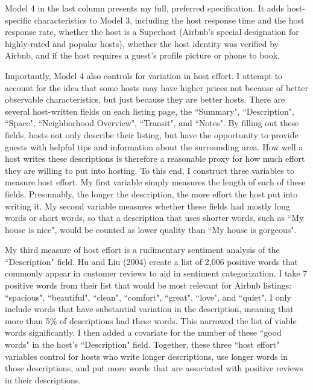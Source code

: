Model 4 in the last column presents my full, preferred specification. It adds host-specific characteristics to Model 3, including the host response time and the host response rate, whether the host is a Superhost (Airbnb's special designation for highly-rated and popular hosts), whether the host identity was verified by Airbnb, and if the host requires a guest's profile picture or phone to book. 

Importantly, Model 4 also controls for variation in host effort. I attempt to account for the idea that some hosts may have higher prices not because of better observable characteristics, but just because they are better hosts. There are several host-written fields on each listing page, the ``Summary", ``Description", ``Space", ``Neighborhood Overview", ``Transit", and ``Notes". By filling out these fields, hosts not only describe their listing, but have the opportunity to provide guests with helpful tips and information about the surrounding area. How well a host writes these descriptions is therefore a reasonable proxy for how much effort they are willing to put into hosting. To this end, I construct three variables to measure host effort. My first variable simply measures the length of each of these fields. Presumably, the longer the description, the more effort the host put into writing it. My second variable measures whether these fields had mostly long words or short words, so that a description that uses shorter words, such as ``My house is nice", would be counted as lower quality than ``My house is gorgeous". 

My third measure of host effort is a rudimentary sentiment analysis of the ``Description" field. Hu and Liu (2004) create a list of 2,006 positive words that commonly appear in customer reviews to aid in sentiment categorization.\cite{hu} I take 7 positive words from their list that would be most relevant for Airbnb listings: ``spacious", ``beautiful", ``clean", ``comfort", ``great", ``love", and ``quiet". I only include words that have substantial variation in the description, meaning that more than 5\% of descriptions had these words. This narrowed the list of viable words significantly. I then added a covariate for the number of these ``good words" in the host's ``Description" field. Together, these three ``host effort" variables control for hosts who write longer descriptions, use longer words in those descriptions, and put more words that are associated with positive reviews in their descriptions. 

